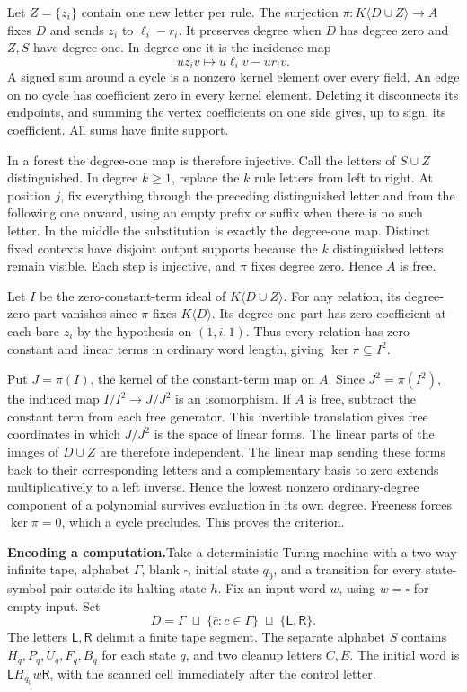 \documentclass[11pt,a4paper]{article}
\newcommand{\Ld}{\mathsf{L}}
\newcommand{\Rd}{\mathsf{R}}
\newcommand{\blank}{\square}
\newcommand{\head}[1]{\par\noindent\textbf{#1}\enspace}
\begin{document}
Let $Z=\{z_i\}$ contain one new letter per rule. The surjection
$\pi:K\langle D\cup Z\rangle\to A$ fixes $D$ and sends $z_i$ to $\ell_i-r_i$. It preserves degree
when $D$ has degree zero and $Z,S$ have degree one. In degree one it is the incidence map
\[
  uz_iv \longmapsto u\ell_iv-ur_iv.
\]
A signed sum around a cycle is a nonzero kernel element over every field. An edge on no cycle
has coefficient zero in every kernel element. Deleting it disconnects its endpoints, and summing
the vertex coefficients on one side gives, up to sign, its coefficient. All sums have finite
support.

In a forest the degree-one map is therefore injective. Call the letters of $S\cup Z$
distinguished. In degree $k\ge1$, replace the $k$ rule letters from left to right. At position
$j$, fix everything through the preceding distinguished letter and from the following one onward,
using an empty prefix or suffix when there is no such letter. In the middle the substitution is
exactly the degree-one map. Distinct fixed contexts have disjoint output supports because the
$k$ distinguished letters remain visible. Each step is injective, and $\pi$ fixes degree zero.
Hence $A$ is free.

Let $I$ be the zero-constant-term ideal of $K\langle D\cup Z\rangle$. For any relation, its
degree-zero part vanishes since $\pi$ fixes $K\langle D\rangle$. Its degree-one part has zero
coefficient at each bare $z_i$ by the hypothesis on $(1,i,1)$. Thus every relation has zero
constant and linear terms in ordinary word length, giving $\ker\pi\subseteq I^2$.

Put $J=\pi(I)$, the kernel of the constant-term map on $A$. Since $J^2=\pi(I^2)$, the induced
map $I/I^2\to J/J^2$ is an isomorphism. If $A$ is free, subtract the constant term from each free
generator. This invertible translation gives free coordinates in which $J/J^2$ is the space of
linear forms. The linear parts of the images of $D\cup Z$ are therefore independent. The linear
map sending these forms back to their corresponding letters and a complementary basis to zero
extends multiplicatively to a left inverse. Hence the lowest nonzero ordinary-degree component of
a polynomial survives evaluation in its own degree. Freeness forces $\ker\pi=0$, which a cycle
precludes. This proves the criterion.

\head{Encoding a computation.}Take a deterministic Turing machine with a two-way infinite tape,
alphabet $\Gamma$, blank $\blank$, initial state $q_0$, and a transition for every state-symbol
pair outside its halting state $h$. Fix an input word $w$, using $w=\blank$ for empty input. Set
\[
  D=\Gamma\;\sqcup\;\{\bar c:c\in\Gamma\}\;\sqcup\;\{\Ld,\Rd\}.
\]
The letters $\Ld,\Rd$ delimit a finite tape segment. The separate alphabet $S$ contains
$H_q,P_q,U_q,F_q,B_q$ for each state $q$, and two cleanup letters $C,E$. The initial word is
$\Ld H_{q_0}w\Rd$, with the scanned cell immediately after the control letter.
\end{document}
